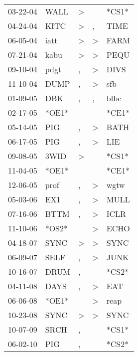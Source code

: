 \begin{supertabular}{lllll}
 03-22-04 &   WALL &     \textgreater &                  &  *CS1* \\
 04-24-04 &   KITC &     \textgreater &                , &   TIME \\
 06-05-04 &   iatt &     \textgreater &     \textgreater &   FARM \\
 07-21-04 &   kabu &     \textgreater &     \textgreater &   PEQU \\
 09-10-04 &   pdgt &                , &     \textgreater &   DIVS \\
 11-10-04 &   DUMP &                , &     \textgreater &    sfb \\
 01-09-05 &    DBK &                , &                , &   blbc \\
 02-17-05 &  *OE1* &                  &                  &  *CE1* \\
 05-14-05 &    PIG &                , &     \textgreater &   BATH \\
 06-17-05 &    PIG &                , &     \textgreater &    LIE \\
 09-08-05 &   3WID &     \textgreater &                  &  *CS1* \\
 11-04-05 &  *OE1* &                  &                  &  *CE1* \\
 12-06-05 &   prof &                , &     \textgreater &   wgtw \\
 05-03-06 &    EX1 &                , &     \textgreater &   MULL \\
 07-16-06 &   BTTM &                , &     \textgreater &   ICLR \\
 11-10-06 &  *OS2* &                  &     \textgreater &   ECHO \\
 04-18-07 &   SYNC &     \textgreater &     \textgreater &   SYNC \\
 06-09-07 &   SELF &                , &     \textgreater &   JUNK \\
 10-16-07 &   DRUM &                , &                  &  *CS2* \\
 04-11-08 &   DAYS &                , &     \textgreater &    EAT \\
 06-06-08 &  *OE1* &                  &     \textgreater &   reap \\
 10-23-08 &   SYNC &     \textgreater &     \textgreater &   SYNC \\
 10-07-09 &   SRCH &                , &                  &  *CS1* \\
 06-02-10 &    PIG &                , &                  &  *CS2* \\

\end{supertabular}
